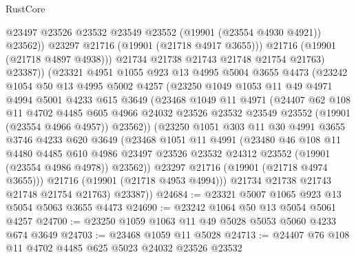 \begin{lexlean}{RustCore}
\begin{coremodule}
                    @23497
                    @23526
                    @23532
                    @23549
                    @23552
                    (@19901 (@23554 @4930 @4921))
                    @23562))
                @23297
                @21716
                (@19901 (@21718 @4917 @3655)))
              @21716
              (@19901 (@21718 @4897 @4938)))
            @21734
            @21738
            @21743
            @21748
            @21754
            @21763)
          @23387))
      (@23321
        @4951
        @1055
        @923
        @13
        @4995
        @5004
        @3655
        @4473
        (@23242
          @1054
          @50
          @13
          @4995
          @5002
          @4257
          (@23250
            @1049
            @1053
            @11
            @49
            @4971
            @4994
            @5001
            @4233
            @615
            @3649
            (@23468
              @1049
              @11
              @4971
              (@24407
                @62
                @108
                @11
                @4702
                @4485
                @605
                @4966
                @24032
                @23526
                @23532
                @23549
                @23552
                (@19901 (@23554 @4966 @4957))
                @23562))
            (@23250
              @1051
              @303
              @11
              @30
              @4991
              @3655
              @3746
              @4233
              @620
              @3649
              (@23468
                @1051
                @11
                @4991
                (@23480
                  @46
                  @108
                  @11
                  @4480
                  @4485
                  @610
                  @4986
                  @23497
                  @23526
                  @23532
                  @24312
                  @23552
                  (@19901 (@23554 @4986 @4978))
                  @23562))
              @23297
              @21716
              (@19901 (@21718 @4974 @3655)))
            @21716
            (@19901 (@21718 @4953 @4994)))
          @21734
          @21738
          @21743
          @21748
          @21754
          @21763)
        @23387))
@24684 := @23321 @5007 @1065 @923 @13 @5054 @5063 @3655 @4473
@24690 := @23242 @1064 @50 @13 @5054 @5061 @4257
@24700 := @23250 @1059 @1063 @11 @49 @5028 @5053 @5060 @4233 @674 @3649
@24703 := @23468 @1059 @11 @5028
@24713 := @24407 @76 @108 @11 @4702 @4485 @625 @5023 @24032 @23526 @23532

\end{coremodule}
\end{lexlean}
